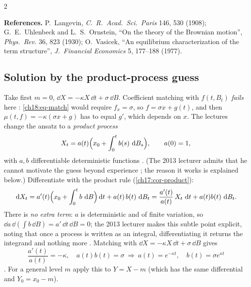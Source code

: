 \begin{paracol}{2}
\begin{history}
\smallskip
{\footnotesize\textbf{References.} P.~Langevin, \emph{C.~R.\ Acad.\ Sci.\ Paris} 146, 530 (1908);
G.~E.~Uhlenbeck and L.~S.~Ornstein, ``On the theory of the Brownian motion'', \emph{Phys.\ Rev.}
36, 823 (1930); O.~Vasicek, ``An equilibrium characterization of the term structure'',
\emph{J.\ Financial Economics} 5, 177--188 (1977).}
\end{history}

\subsection{Solution by the product-process guess}
Take first $m=0$, $\dd X=-\kappa X\,\dd t+\sigma\,\dd B$. Coefficient matching with $f(t,B_t)$ \emph{fails} here : \eqref{ch18:eq-match} would require $f_x=\sigma$, so $f=\sigma x+g(t)$, and then $\mu(t,f)=-\kappa(\sigma x+g)$ has to equal $g'$, which depends on $x$. The lectures change the ansatz to a \emph{product process}
\begin{equation}\label{ch18:eq-product}
  X_t=a(t)\Bigl(x_0+\int_0^tb(s)\,\,\mathrm{d} B_s\Bigr),\qquad a(0)=1,
\end{equation}
with $a,b$ differentiable deterministic functions . (The 2013 lecturer admits that he cannot motivate the guess beyond experience ; the reason it works is explained below.) Differentiate with the product rule (\cref{ch17:cor-product}):
\[
  \,\mathrm{d} X_t=a'(t)\Bigl(x_0+\int_0^tb\,\,\mathrm{d} B\Bigr)\,\mathrm{d} t+a(t)\,b(t)\,\,\mathrm{d} B_t=\frac{a'(t)}{a(t)}\,X_t\,\,\mathrm{d} t+a(t)b(t)\,\,\mathrm{d} B_t .
\]
There is \emph{no extra term}: $a$ is deterministic and of finite variation, so $\dd a\,\dd(\int b\,\dd B)=a'\,\dd t\,\dd B=0$; the 2013 lecturer makes this subtle point explicit, noting that once a process is written as an integral, differentiating it returns the integrand and nothing more . Matching with $\dd X=-\kappa X\,\dd t+\sigma\,\dd B$ gives
\[
  \frac{a'(t)}{a(t)}=-\kappa,\quad a(t)b(t)=\sigma\ \Longrightarrow\ a(t)=e^{-\kappa t},\quad b(t)=\sigma e^{\kappa t}
\]
. For a general level $m$ apply this to $Y=X-m$ (which has the same differential and $Y_0=x_0-m$).


\end{paracol}
